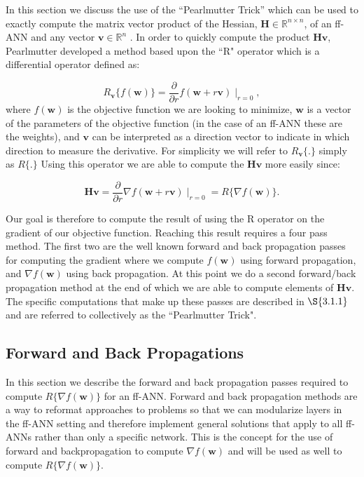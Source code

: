 \documentclass[letterpaper,12pt,titlepage,oneside,final]{book}
\begin{document}
	In this section we discuss the use of the ``Pearlmutter Trick'' which can be used to exactly compute the matrix vector product of the Hessian, $\mathbf{H} \in \mathbb{R}^{n\times n}$, of an ff-ANN and any vector $\mathbf{v} \in \mathbb{R}^{n}$ \cite{Pearlmutter.1993}. In order to quickly compute the product $\mathbf{Hv}$, Pearlmutter developed a method based upon the ``R" operator which is a differential operator \cite{Pearlmutter.1993} defined as:
	
	\begin{equation}
	R_{\mathbf{v}}\{f(\mathbf{w})\} = \frac{\partial}{\partial r}f(\mathbf{w} + r\mathbf{v})\mid_{r=0} ,
	\end{equation}
	where $f(\mathbf{w})$ is the objective function we are looking to minimize, $\mathbf{w}$ is a vector of the parameters of the objective function (in the case of an ff-ANN these are the weights), and $\mathbf{v}$ can be interpreted as a direction vector to indicate in which direction to measure the derivative. For simplicity we will refer to $R_{\mathbf{v}}\{.\}$ simply as $R\{.\}$ Using this operator we are able to compute the $\mathbf{Hv}$ more easily since:
	
	\begin{equation}
	\mathbf{Hv} = \frac{\partial}{\partial r}\nabla{f}(\mathbf{w} + r\mathbf{v})\mid_{r=0} = R\{\nabla{f(\mathbf{w})}\}.
	\end{equation}
	
	Our goal is therefore to compute the result of using the R operator on the gradient of our objective function. Reaching this result requires a four pass method. The first two are the well known forward and back propagation passes for computing the gradient where we compute $f(\mathbf{w})$ using forward propagation, and $\nabla{f(\mathbf{w})}$ using back propagation. At this point we do a second forward/back propagation method at the end of which we are able to compute elements of $\mathbf{Hv}$.  The specific computations that make up these passes are described in $\S{3.1.1}$ and are referred to collectively as the ``Pearlmutter Trick".  
	
	\subsection{Forward and Back Propagations}
	
	In this section we describe the forward and back propagation passes required to compute $R\{\nabla{f(\mathbf{w})}\}$ for an ff-ANN. Forward and back propagation methods are a way to reformat approaches to problems so that we can modularize layers in the ff-ANN setting and therefore implement general solutions that apply to all ff-ANNs rather than only a specific network. This is the concept for the use of forward and backpropagation to compute $\nabla{f(\mathbf{w})}$ and will be used as well to compute $R\{\nabla{f(\mathbf{w})}\}$.
	
\end{document}
